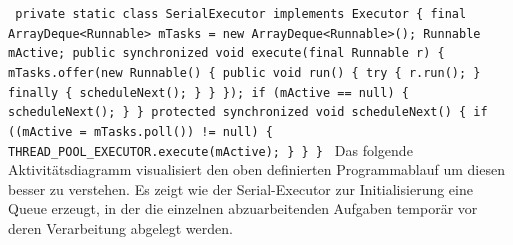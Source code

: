 \documentclass[12pt,oneside,a4paper,bibtotoc,liststotoc]{scrreprt}
\begin{document}
\texttt{\newline
private static class SerialExecutor implements Executor \{\newline
    final ArrayDeque<Runnable> mTasks = new ArrayDeque<Runnable>();\newline
    Runnable mActive;\newline
\newline
    public synchronized void execute(final Runnable r) \{\newline
        mTasks.offer(new Runnable() \{\newline
            public void run() \{\newline
                try \{\newline
                    r.run();\newline
                \} finally \{\newline
                    scheduleNext();\newline
                \}\newline
            \}\newline
        \});\newline
        if (mActive == null) \{\newline
            scheduleNext();\newline
        \}\newline
    \}\newline
        protected synchronized void scheduleNext() \{\newline
        if ((mActive = mTasks.poll()) != null) \{\newline
            THREAD\_POOL\_EXECUTOR.execute(mActive);\newline
        \}\newline
    \}\newline
\}\newline
}\newline
Das folgende Aktivitätsdiagramm visualisiert den oben definierten Programmablauf um diesen besser zu verstehen. Es zeigt wie der Serial-Executor zur Initialisierung eine Queue erzeugt, in der die einzelnen abzuarbeitenden Aufgaben temporär vor deren Verarbeitung abgelegt werden.
\end{document}
